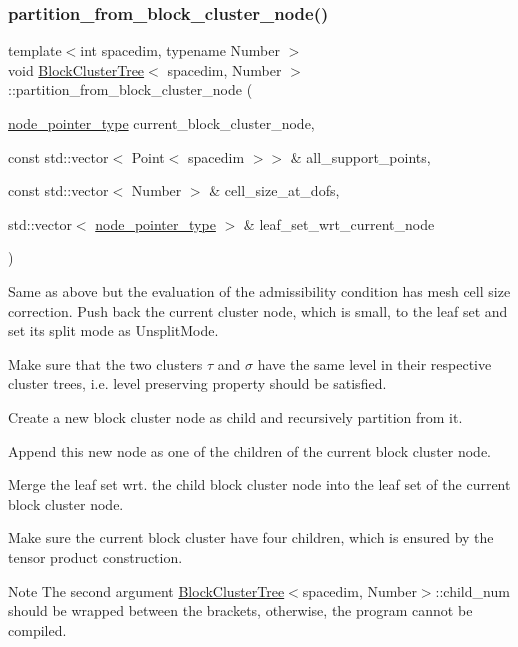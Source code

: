 \subsubsection{\texorpdfstring{partition\+\_\+from\+\_\+block\+\_\+cluster\+\_\+node()}{partition\_from\_block\_cluster\_node()}\hspace{0.1cm}{\footnotesize\ttfamily [2/2]}}
{\footnotesize\ttfamily template$<$int spacedim, typename Number $>$ \\
void \hyperlink{classBlockClusterTree}{Block\+Cluster\+Tree}$<$ spacedim, Number $>$\+::partition\+\_\+from\+\_\+block\+\_\+cluster\+\_\+node (\begin{DoxyParamCaption}\item[{\hyperlink{classTreeNode}{node\+\_\+pointer\+\_\+type}}]{current\+\_\+block\+\_\+cluster\+\_\+node,  }\item[{const std\+::vector$<$ Point$<$ spacedim $>$$>$ \&}]{all\+\_\+support\+\_\+points,  }\item[{const std\+::vector$<$ Number $>$ \&}]{cell\+\_\+size\+\_\+at\+\_\+dofs,  }\item[{std\+::vector$<$ \hyperlink{classTreeNode}{node\+\_\+pointer\+\_\+type} $>$ \&}]{leaf\+\_\+set\+\_\+wrt\+\_\+current\+\_\+node }\end{DoxyParamCaption})\hspace{0.3cm}{\ttfamily [private]}}

Same as above but the evaluation of the admissibility condition has mesh cell size correction. Push back the current cluster node, which is small, to the leaf set and set its split mode as {\ttfamily Unsplit\+Mode}.

Make sure that the two clusters $\tau$ and $\sigma$ have the same level in their respective cluster trees, i.\+e. level preserving property should be satisfied.

Create a new block cluster node as child and recursively partition from it.

Append this new node as one of the children of the current block cluster node.

Merge the leaf set wrt. the child block cluster node into the leaf set of the current block cluster node.

Make sure the current block cluster have four children, which is ensured by the tensor product construction.


\begin{DoxyDescription}
\item[Note ]The second argument {\ttfamily \hyperlink{classBlockClusterTree}{Block\+Cluster\+Tree}$<$spacedim}, Number$>$\+::child\+\_\+num should be wrapped between the brackets, otherwise, the program cannot be compiled. 
\end{DoxyDescription}

